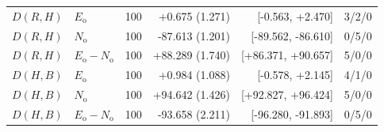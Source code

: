 \begin{longtable}{lllrrr}
$D(R,H)$ & $E_{\mathrm{o}}$ & 100 & +0.675 (1.271) & [-0.563, +2.470] & 3/2/0\\
$D(R,H)$ & $N_{\mathrm{o}}$ & 100 & -87.613 (1.201) & [-89.562, -86.610] & 0/5/0\\
$D(R,H)$ & $E_{\mathrm{o}}-N_{\mathrm{o}}$ & 100 & +88.289 (1.740) & [+86.371, +90.657] & 5/0/0\\
$D(H,B)$ & $E_{\mathrm{o}}$ & 100 & +0.984 (1.088) & [-0.578, +2.145] & 4/1/0\\
$D(H,B)$ & $N_{\mathrm{o}}$ & 100 & +94.642 (1.426) & [+92.827, +96.424] & 5/0/0\\
$D(H,B)$ & $E_{\mathrm{o}}-N_{\mathrm{o}}$ & 100 & -93.658 (2.211) & [-96.280, -91.893] & 0/5/0\\
\bottomrule
\end{longtable}
\endgroup

